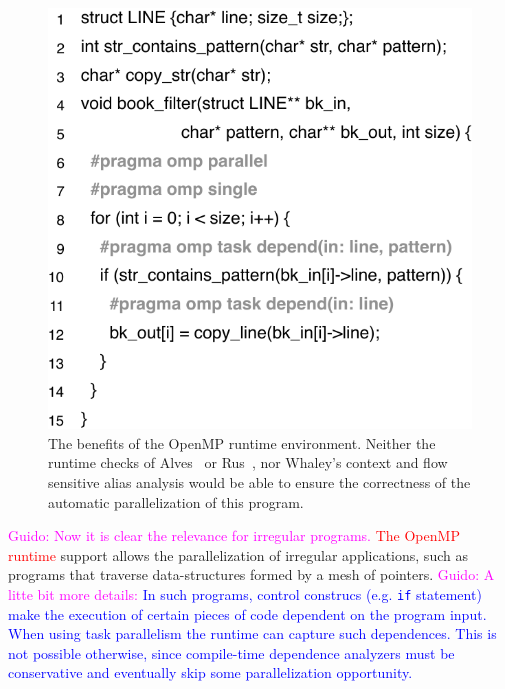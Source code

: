 \documentclass[sigplan,10pt,review,anonymous]{acmart}
\newcommand{\guido}[1]{\noindent\textcolor{magenta}{Guido: {#1}}}
\newcommand{\new}[1]{\noindent\textcolor{blue}{ {#1}}}
\newcommand{\ed}[1]{\noindent\textcolor{red}{ {#1}}}
\newcommand{\guido}[1]{}
\newcommand{\new}[1]{#1}
\newcommand{\ed}[1]{}
\begin{document}
\begin{figure}[t!]
\begin{center}
\includegraphics[width=0.9\columnwidth]{images/ex_book_filter}
\caption{The benefits of the OpenMP runtime environment.
Neither the runtime checks of Alves~\cite{Alves15} or Rus~\cite{Rus02}, nor
Whaley's context and flow sensitive alias analysis would be able to ensure the
correctness of the automatic parallelization of this program.}
\label{fig:ex_book_filter}
\end{center}
\end{figure}

\guido{Now it is clear the relevance for irregular programs.}
\ed{The OpenMP runtime} support allows the parallelization of irregular applications,
such as programs that traverse data-structures formed by a mesh of pointers.
\guido{A litte bit more details: }
\new{In such programs, control construcs (e.g. {\tt if} statement) make the execution 
of certain pieces of code  dependent on the program input. When using 
task parallelism the runtime can capture such dependences. This is not possible 
otherwise, since compile-time dependence analyzers must be conservative and eventually
skip some parallelization opportunity.}
\end{document}
